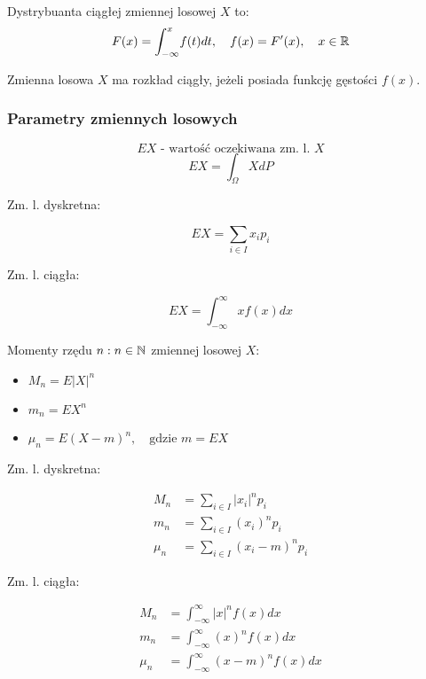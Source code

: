 \documentclass[../Matematyka.tex]{subfiles}
\begin{document}
Dystrybuanta ciągłej zmiennej losowej \(X\) to:
\[F(x) = \int_{-\infty}^{x}\!f(t)dt, \quad f(x) = F^\prime(x), \quad x \in \mathbb{R}\]

Zmienna losowa \(X\) ma rozkład ciągły, jeżeli posiada funkcję gęstości \(f(x)\).

\newpage
\subsubsection*{Parametry zmiennych losowych}
\[EX \text{ - wartość oczekiwana zm. l. } X\]
\[EX = \int_\Omega\!XdP\]

\begin{multicols}{2}
    \begin{center}
        Zm. l. dyskretna:
    \end{center}
    \[EX = \sum_{i \in I} x_ip_i\]

    \begin{center}
        Zm. l. ciągła:
    \end{center}
    \[EX = \int_{-\infty}^{\infty}\!xf(x)dx\]
\end{multicols}

Momenty rzędu \(n : n \in \mathbb{N}\) zmiennej losowej \(X\):
\begin{itemize}
    \item {}   \(M_n = E|X|^n\)
    \item {}      \(m_n = EX^n\)
    \item {}   \(\mu_n = E(X-m)^n, \quad \text{gdzie } m = EX\)
\end{itemize}

\begin{multicols}{2}
    \begin{center}
        Zm. l. dyskretna:
    \end{center}
    \begin{align*}
        M_n   & = \sum_{i \in I} |x_i|^np_i     \\
        m_n   & = \sum_{i \in I} (x_i)^np_i     \\
        \mu_n & = \sum_{i \in I} (x_i - m)^np_i
    \end{align*}

    \begin{center}
        Zm. l. ciągła:
    \end{center}
    \begin{align*}
        M_n   & = \int_{-\infty}^{\infty}\!|x|^nf(x)dx     \\
        m_n   & = \int_{-\infty}^{\infty}\!(x)^nf(x)dx     \\
        \mu_n & = \int_{-\infty}^{\infty}\!(x - m)^nf(x)dx
    \end{align*}
\end{multicols}
\end{document}

